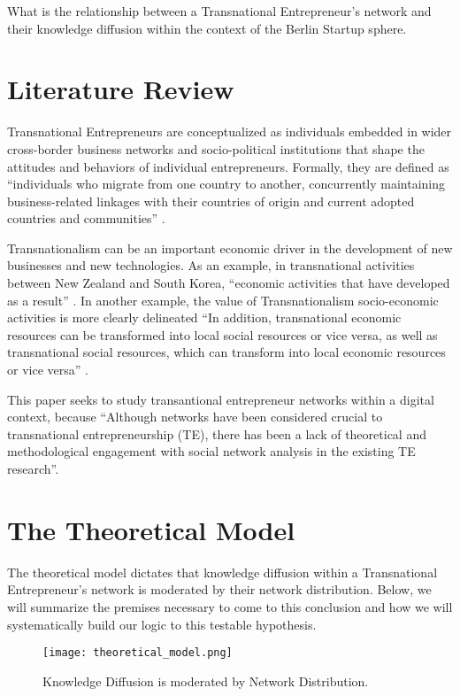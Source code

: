 What is the relationship between a Transnational Entrepreneur's
network and their knowledge diffusion within the context of the Berlin
Startup sphere.

\section{Literature Review}
Transnational Entrepreneurs are conceptualized as individuals embedded
in wider cross-border business networks and socio-political
institutions that shape the attitudes and behaviors of individual
entrepreneurs. Formally, they are defined as ``individuals who migrate
from one country to another, concurrently maintaining business-related
linkages with their countries of origin and current adopted countries
and communities'' \cite{Drori.2009}.

Transnationalism can be an important economic driver in the
development of new businesses and new technologies. As an example, in
transnational activities between New Zealand and South Korea,
``economic activities that have developed as a result''
\cite{Collins.2008}. In another example, the value of Transnationalism
socio-economic activities is more clearly delineated ``In addition,
transnational economic resources can be transformed into local social
resources or vice versa, as well as transnational social resources,
which can transform into local economic resources or vice versa''
\cite{Ren.2015}.

This paper seeks to study transantional entrepreneur networks within a
digital context, because ``Although networks have been considered
crucial to transnational entrepreneurship (TE), there has been a lack
of theoretical and methodological engagement with social network
analysis in the existing TE research''\cite{Chen.2009}.




\section{The Theoretical Model}
The theoretical model dictates that knowledge diffusion within a
Transnational Entrepreneur's network is moderated by their network
distribution. Below, we will summarize the premises necessary to come
to this conclusion and how we will systematically build our logic to
this testable hypothesis.

\begin{figure}[!ht]
  \centering
  \texttt{[image: theoretical\_model.png]}
  \caption{Knowledge Diffusion is moderated by Network Distribution.}
\end{figure}

